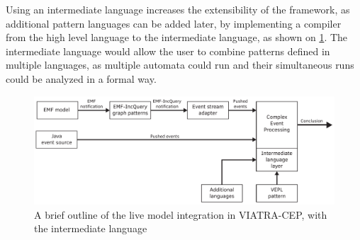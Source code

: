 Using an intermediate language increases the extensibility of the framework, as additional pattern languages can be added later, by implementing a compiler from the high level language to the intermediate language, as shown on \cref{fig:viatracep:newinputs}.
The intermediate language would allow the user to combine patterns defined in multiple languages, as multiple automata could run and their simultaneous runs could be analyzed in a formal way.


\begin{figure}[h]
	\centering
	\includegraphics[width=0.9\linewidth]{figures/chapter_3/newinput}
	\caption{A brief outline of the live model integration in VIATRA-CEP, with the intermediate language \redraw}
	\label{fig:viatracep:newinputs}
\end{figure}